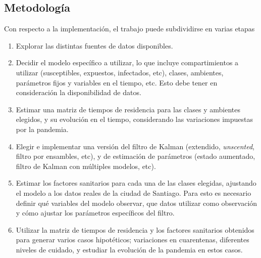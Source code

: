\begin{intro}


 

\section*{Metodología}

Con respecto a la implementación, el trabajo puede subdividirse en varias etapas

\begin{enumerate}
    \item Explorar las distintas fuentes de datos disponibles.
    \item Decidir el modelo específico a utilizar, lo que incluye compartimientos a utilizar (susceptibles, expuestos, infectados, etc), clases, ambientes, parámetros fijos y variables en el tiempo, etc. Esto debe tener en consideración la disponibilidad de datos.
    \item Estimar una matriz de tiempos de residencia para las clases y ambientes elegidos, y su evolución en el tiempo, considerando las variaciones impuestas por la pandemia.
    \item Elegir e implementar una versión del filtro de Kalman (extendido, \textit{unscented}, filtro por ensambles, etc), y de estimación de parámetros (estado aumentado, filtro de Kalman con múltiples modelos, etc). 
    \item Estimar los factores sanitarios para cada una de las clases elegidas, ajustando el modelo a los datos reales de la ciudad de Santiago. Para esto es necesario definir qué variables del modelo observar, que datos utilizar como observación y cómo ajustar los parámetros específicos del filtro.
    \item Utilizar la matriz de tiempos de residencia y los factores sanitarios obtenidos para generar varios casos hipotéticos; variaciones en cuarentenas, diferentes niveles de cuidado, y estudiar la evolución de la pandemia en estos casos.
\end{enumerate}




\end{intro}
